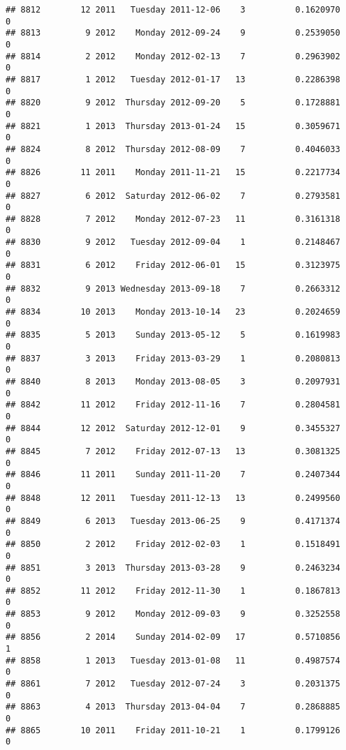\documentclass[
]{article}
\begin{document}
\begin{verbatim}
## 8812        12 2011   Tuesday 2011-12-06    3          0.1620970             0
## 8813         9 2012    Monday 2012-09-24    9          0.2539050             0
## 8814         2 2012    Monday 2012-02-13    7          0.2963902             0
## 8817         1 2012   Tuesday 2012-01-17   13          0.2286398             0
## 8820         9 2012  Thursday 2012-09-20    5          0.1728881             0
## 8821         1 2013  Thursday 2013-01-24   15          0.3059671             0
## 8824         8 2012  Thursday 2012-08-09    7          0.4046033             0
## 8826        11 2011    Monday 2011-11-21   15          0.2217734             0
## 8827         6 2012  Saturday 2012-06-02    7          0.2793581             0
## 8828         7 2012    Monday 2012-07-23   11          0.3161318             0
## 8830         9 2012   Tuesday 2012-09-04    1          0.2148467             0
## 8831         6 2012    Friday 2012-06-01   15          0.3123975             0
## 8832         9 2013 Wednesday 2013-09-18    7          0.2663312             0
## 8834        10 2013    Monday 2013-10-14   23          0.2024659             0
## 8835         5 2013    Sunday 2013-05-12    5          0.1619983             0
## 8837         3 2013    Friday 2013-03-29    1          0.2080813             0
## 8840         8 2013    Monday 2013-08-05    3          0.2097931             0
## 8842        11 2012    Friday 2012-11-16    7          0.2804581             0
## 8844        12 2012  Saturday 2012-12-01    9          0.3455327             0
## 8845         7 2012    Friday 2012-07-13   13          0.3081325             0
## 8846        11 2011    Sunday 2011-11-20    7          0.2407344             0
## 8848        12 2011   Tuesday 2011-12-13   13          0.2499560             0
## 8849         6 2013   Tuesday 2013-06-25    9          0.4171374             0
## 8850         2 2012    Friday 2012-02-03    1          0.1518491             0
## 8851         3 2013  Thursday 2013-03-28    9          0.2463234             0
## 8852        11 2012    Friday 2012-11-30    1          0.1867813             0
## 8853         9 2012    Monday 2012-09-03    9          0.3252558             0
## 8856         2 2014    Sunday 2014-02-09   17          0.5710856             1
## 8858         1 2013   Tuesday 2013-01-08   11          0.4987574             0
## 8861         7 2012   Tuesday 2012-07-24    3          0.2031375             0
## 8863         4 2013  Thursday 2013-04-04    7          0.2868885             0
## 8865        10 2011    Friday 2011-10-21    1          0.1799126             0

\end{verbatim}
\end{document}
